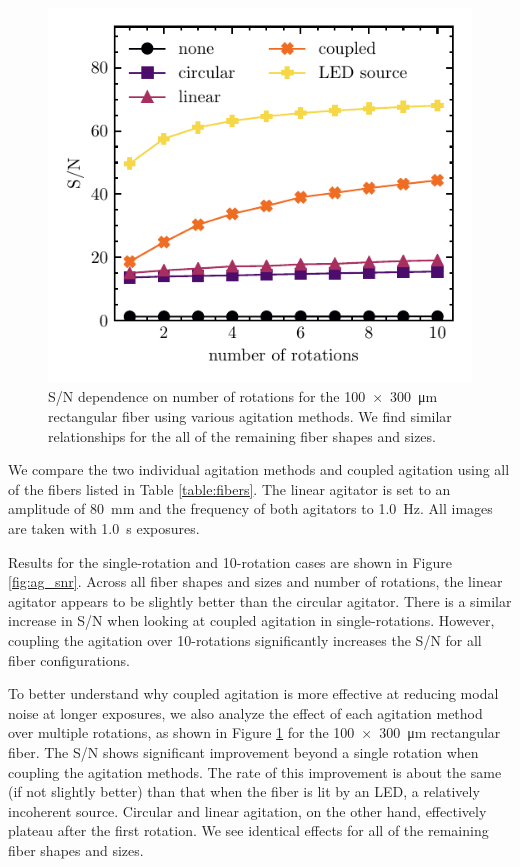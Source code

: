 \begin{figure}
\centering
	\includegraphics[width=\columnwidth]{figures-2/rect_snr_vs_time.pdf}
	\caption[Signal-to-noise comparison across number of rotations and agitation method]{S/N dependence on number of rotations for the \SI{100x300}{\micro\meter} rectangular fiber using various agitation methods. We find similar relationships for the all of the remaining fiber shapes and sizes.}
\label{fig:rect_snr_vs_time}
\end{figure}

We compare the two individual agitation methods and coupled agitation using all of the fibers listed in Table \ref{table:fibers}. The linear agitator is set to an amplitude of \SI{80}{\milli\meter} and the frequency of both agitators to \SI{1.0}{\hertz}. All images are taken with \SI{1.0}{\second} exposures.

Results for the single-rotation and 10-rotation cases are shown in Figure \ref{fig:ag_snr}. Across all fiber shapes and sizes and number of rotations, the linear agitator appears to be slightly better than the circular agitator. There is a similar increase in S/N when looking at coupled agitation in single-rotations. However, coupling the agitation over 10-rotations significantly increases the S/N for all fiber configurations.

To better understand why coupled agitation is more effective at reducing modal noise at longer exposures, we also analyze the effect of each agitation method over multiple rotations, as shown in Figure \ref{fig:rect_snr_vs_time} for the \SI{100x300}{\micro\meter} rectangular fiber. The S/N shows significant improvement beyond a single rotation when coupling the agitation methods. The rate of this improvement is about the same (if not slightly better) than that when the fiber is lit by an LED, a relatively incoherent source. Circular and linear agitation, on the other hand, effectively plateau after the first rotation. We see identical effects for all of the remaining fiber shapes and sizes.

